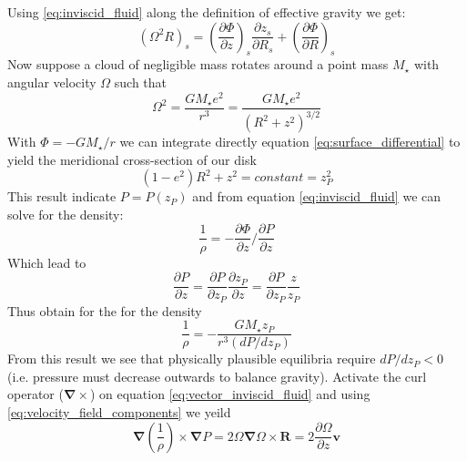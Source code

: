 \documentclass[a4paper,12pt,modern]{aastex62}
\renewcommand{\vec}[1]{\mathbf{#1}}
\begin{document}
Using \ref{eq:inviscid_fluid} along the definition of effective gravity we get:
\begin{equation}\label{eq:surface_differential}
\left( \Omega^2R \right)_s = \left( \frac{\partial \Phi}{\partial z} \right)_s \frac{\partial z_s}{\partial R_s} + \left( \frac{\partial \Phi}{\partial R} \right)_s
\end{equation}
Now suppose a cloud of negligible mass rotates around a point mass $M_\star$ with angular velocity $\Omega$ such that 
\begin{equation}
\Omega^2=\frac{GM_\star e^2}{r^3}=\frac{GM_\star e^2}{(R^2+z^2)^{3/2}}
\end{equation}
With $\Phi=-GM_\star/r$ we can integrate directly equation \ref{eq:surface_differential} to yield the meridional cross-section of our disk
\begin{equation}
(1-e^2)R^2+z^2=constant=z^2_P
\end{equation}
This result indicate $P=P(z_P)$ and from equation \ref{eq:inviscid_fluid} we can solve for the density:
\begin{equation}
\frac{1}{\rho}=-\frac{\partial \Phi}{\partial z} / \frac{\partial P}{\partial z}
\end{equation}
Which lead to 
\begin{equation}
\frac{\partial P}{\partial z} = \frac{\partial P}{\partial z_P}\frac{\partial z_P}{\partial z} = \frac{\partial P}{\partial z_P}\frac{z }{z_P}
\end{equation}
Thus obtain for the for the density
\begin{equation}
\frac{1}{\rho}=-\frac{GM_\star z_P}{r^3(dP/dz_P)}
\end{equation}
From this result we see that physically plausible equilibria require $dP/dz_P<0$ (i.e. pressure must decrease outwards to balance gravity). 
Activate the curl operator ($\mathbf{\nabla}\times$) on equation \ref{eq:vector_inviscid_fluid} and using  \ref{eq:velocity_field_components} we yeild
\begin{equation}
    \vec\nabla\left(\frac{1}{\rho}\right)\times\vec\nabla P = 2\Omega \vec\nabla \Omega \times \vec R = 2\frac{\partial \Omega}{\partial z} \vec v
\end{equation}
\end{document}
